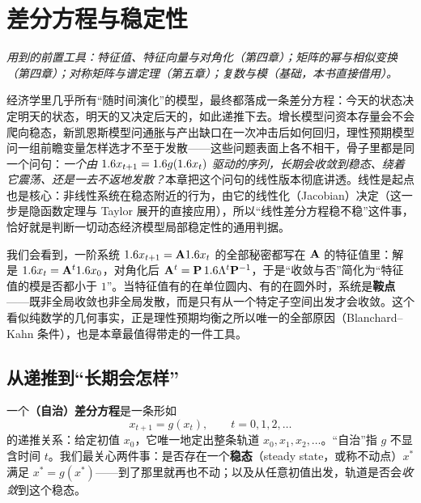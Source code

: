 \chapter{差分方程与稳定性}
\label{ch:difference}

\noindent\emph{用到的前置工具：特征值、特征向量与对角化（第四章）；矩阵的幂与相似变换（第四章）；对称矩阵与谱定理（第五章）；复数与模（基础，本书直接借用）。}
\medskip

经济学里几乎所有``随时间演化''的模型，最终都落成一条差分方程：今天的状态决定明天的状态，明天的又决定后天的，如此递推下去。增长模型问资本存量会不会爬向稳态，新凯恩斯模型问通胀与产出缺口在一次冲击后如何回归，理性预期模型问一组前瞻变量怎样选才不至于发散——这些问题表面上各不相干，骨子里都是同一个问句：\emph{一个由 $1.6 x_{t+1}=1.6 g(1.6 x_t)$ 驱动的序列，长期会收敛到稳态、绕着它震荡、还是一去不返地发散？}本章把这个问句的线性版本彻底讲透。线性是起点也是核心：非线性系统在稳态附近的行为，由它的线性化（Jacobian）决定（这一步是隐函数定理与 Taylor 展开的直接应用），所以``线性差分方程稳不稳''这件事，恰好就是判断一切动态经济模型局部稳定性的通用判据。

我们会看到，一阶系统 $1.6 x_{t+1}=\mathbf{A}1.6 x_t$ 的全部秘密都写在 $\mathbf{A}$ 的特征值里：解是 $1.6 x_t=\mathbf{A}^t1.6 x_0$，对角化后 $\mathbf{A}^t=\mathbf{P}\,1.6\Lambda^t{\mathbf{P}}^{-1}$，于是``收敛与否''简化为``特征值的模是否都小于 $1$''。当特征值有的在单位圆内、有的在圆外时，系统是\textbf{鞍点}——既非全局收敛也非全局发散，而是只有从一个特定子空间出发才会收敛。这个看似纯数学的几何事实，正是理性预期均衡之所以唯一的全部原因（Blanchard–Kahn 条件），也是本章最值得带走的一件工具。

\section{从递推到``长期会怎样''}
\label{sec:difference-1}

一个\textbf{（自治）差分方程}是一条形如
\[
    x_{t+1}=g(x_t),\qquad t=0,1,2,\dots
\]
的递推关系：给定初值 $x_0$，它唯一地定出整条轨道 $x_0,x_1,x_2,\dots$。``自治''指 $g$ 不显含时间 $t$。我们最关心两件事：是否存在一个\textbf{稳态}（steady state，或称不动点）$x^\ast$ 满足 $x^\ast=g(x^\ast)$——到了那里就再也不动；以及从任意初值出发，轨道是否会\emph{收敛}到这个稳态。


